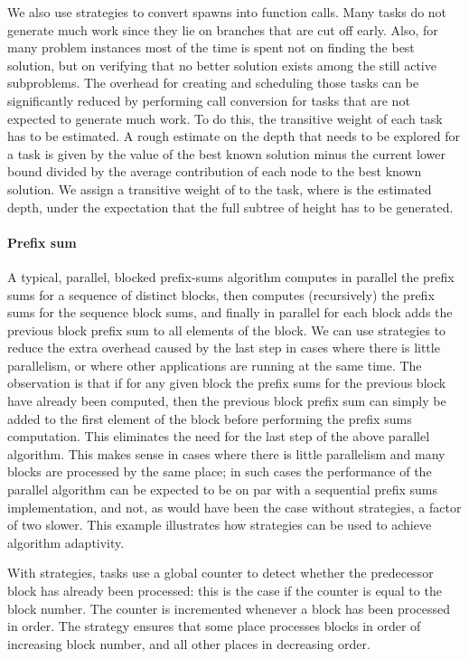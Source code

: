 \documentclass[a4paper,11pt]{article}
\begin{document}
We also use strategies to
convert spawns into function calls. Many tasks do not generate
much work since they lie on branches that are cut off early. Also, for
many problem instances most of the time is spent not on finding the
best solution, but on verifying that no better solution exists among
the still active subproblems. The overhead for creating and scheduling
those tasks can be significantly reduced by performing call conversion
for tasks that are not expected to generate much work. To do this, the
transitive weight of each task has to be estimated. A rough estimate
on the depth that needs to be explored for a task is given by the
value of the best known solution minus the current lower bound divided
by the average contribution of each node to the best known
solution.
We assign a transitive weight of  to the task, where 
is the estimated depth, under the expectation that the full subtree of
height  has to be generated.

\paragraph{Prefix sum}
\label{sec:prefix}

A typical, parallel, blocked prefix-sums algorithm computes in
parallel the prefix sums for a sequence of distinct blocks, then
computes (recursively) the prefix sums for the sequence block sums,
and finally in parallel for each block adds the previous block prefix
sum to all elements of the block. We can use strategies to reduce the
extra overhead caused by the last step in cases where there is little
parallelism, or where other applications are running at the same
time. The observation is that if for any given block the prefix sums
for the previous block have already been computed, then the previous
block prefix sum can simply be added to the first element of the block
before performing the prefix sums computation. This eliminates the
need for the last step of the above parallel algorithm. This makes
sense in cases where there is little parallelism and many blocks are
processed by the same place; in such cases the performance of the
parallel algorithm can be expected to be on par with a sequential
prefix sums implementation, and not, as would have been the case
without strategies, a factor of two slower. This example illustrates
how strategies can be used to achieve algorithm adaptivity.

With strategies, tasks use a global counter to detect whether the
predecessor block has already been processed: this is the case if the
counter is equal to the block number. The counter is incremented
whenever a block has been processed in order. The strategy ensures
that some place processes blocks in order of increasing block number,
and all other places in decreasing order.
\end{document}
